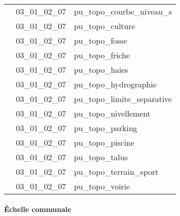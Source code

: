 \documentclass[12pt,titlepage,oneside]{book}
\begin{document}
\begin{supertabular}{|p{10cm}|c|p{15cm}|}
                    & 03\_01\_02\_07 & pu\_topo\_courbe\_niveau\_s\\


                    & 03\_01\_02\_07 & pu\_topo\_culture\\


                    & 03\_01\_02\_07 & pu\_topo\_fosse\\


                    & 03\_01\_02\_07 & pu\_topo\_friche\\


                    & 03\_01\_02\_07 & pu\_topo\_haies\\


                    & 03\_01\_02\_07 & pu\_topo\_hydrographie\\


                    & 03\_01\_02\_07 & pu\_topo\_limite\_separative\\


                    & 03\_01\_02\_07 & pu\_topo\_nivellement\\


                    & 03\_01\_02\_07 & pu\_topo\_parking\\


                    & 03\_01\_02\_07 & pu\_topo\_piscine\\


                    & 03\_01\_02\_07 & pu\_topo\_talus\\


                    & 03\_01\_02\_07 & pu\_topo\_terrain\_sport\\


                    & 03\_01\_02\_07 & pu\_topo\_voirie\\
\hline
\end{supertabular}


\paragraph{Échelle communale}
\noindent
\vspace{\baselineskip}
\end{document}
